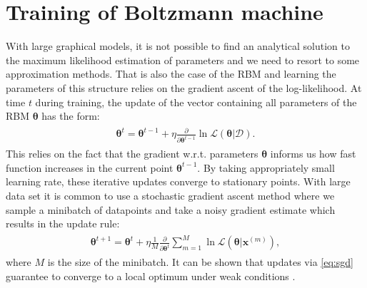 \section{Training of Boltzmann machine}
With large graphical models, it is not possible to find an analytical solution to the maximum likelihood estimation of parameters and we need to resort to some approximation methods. That is also the case of the RBM and learning the parameters of this structure relies on the gradient ascent of the log-likelihood. At time $t$ during training, the update of the vector containing all parameters of the RBM $\mathbf{\theta}$ has the form:
\begin{align}
\begin{split}
\mathbf{\theta}^{t} = \mathbf{\theta}^{t-1} + \eta  \frac{\partial}{\partial \mathbf{\theta}^{t-1}}  \ln \mathcal{L}(\mathbf{\theta}| \mathcal{D}). 
\end{split}
\end{align}
This relies on the fact that the gradient w.r.t. parameters $\mathbf{\theta}$ informs us how fast function increases in the current point $\mathbf{\theta}^{t-1}$. 
By taking appropriately small learning rate, these iterative updates converge to stationary points. With large data set it is common to use a stochastic gradient ascent method \cite{robbins1951stochastic} where we sample a minibatch of datapoints and take a noisy gradient estimate which results in the update rule:
\begin{align}
\begin{split}
\mathbf{\theta}^{t+1} = \mathbf{\theta}^{t} + \eta \frac{1}{M} \frac{\partial}{\partial \mathbf{\theta}^t}  \sum_{m =1}^{M} \ln \mathcal{L}(\mathbf{\theta}| \mathbf{x}^{(m)}),
\end{split}
\label{eq:sgd}
\end{align}
where $M$ is the size of the minibatch. It can be shown that updates via \ref{eq:sgd} guarantee to converge to a local optimum under weak conditions \cite{bottou1998online}.

